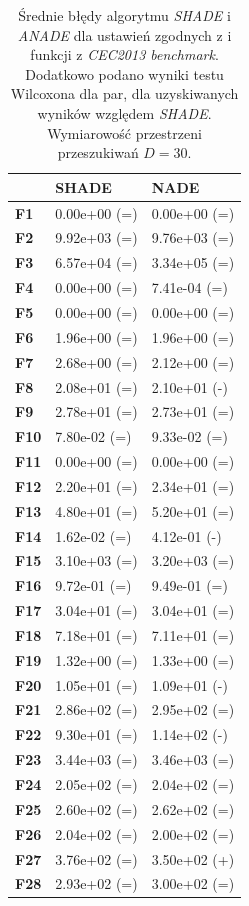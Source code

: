 \documentclass[12pt,a4paper]{report}
\begin{document}
{{{{{{\begin{table}[]
\centering
\caption{Średnie błędy algorytmu \emph{SHADE} i \emph{ANADE} dla ustawień zgodnych z \cite{SHADE} i funkcji z \emph{CEC2013 benchmark}. Dodatkowo podano wyniki testu Wilcoxona dla par, dla uzyskiwanych wyników względem \emph{SHADE}. Wymiarowość przestrzeni przeszukiwań $D = 30$.}
\label{Eksp230}
\begin{tabular}{|l|l|l|}
\hline
          & {\bf SHADE}  & {\bf NADE}   \\ \hline
{\bf F1}  & 0.00e+00 (=) & 0.00e+00 (=) \\ \hline
{\bf F2}  & 9.92e+03 (=) & 9.76e+03 (=) \\ \hline
{\bf F3}  & 6.57e+04 (=) & 3.34e+05 (=) \\ \hline
{\bf F4}  & 0.00e+00 (=) & 7.41e-04 (=) \\ \hline
{\bf F5}  & 0.00e+00 (=) & 0.00e+00 (=) \\ \hline
{\bf F6}  & 1.96e+00 (=) & 1.96e+00 (=) \\ \hline
{\bf F7}  & 2.68e+00 (=) & 2.12e+00 (=) \\ \hline
{\bf F8}  & 2.08e+01 (=) & 2.10e+01 (-) \\ \hline
{\bf F9}  & 2.78e+01 (=) & 2.73e+01 (=) \\ \hline
{\bf F10} & 7.80e-02 (=) & 9.33e-02 (=) \\ \hline
{\bf F11} & 0.00e+00 (=) & 0.00e+00 (=) \\ \hline
{\bf F12} & 2.20e+01 (=) & 2.34e+01 (=) \\ \hline
{\bf F13} & 4.80e+01 (=) & 5.20e+01 (=) \\ \hline
{\bf F14} & 1.62e-02 (=) & 4.12e-01 (-) \\ \hline
{\bf F15} & 3.10e+03 (=) & 3.20e+03 (=) \\ \hline
{\bf F16} & 9.72e-01 (=) & 9.49e-01 (=) \\ \hline
{\bf F17} & 3.04e+01 (=) & 3.04e+01 (=) \\ \hline
{\bf F18} & 7.18e+01 (=) & 7.11e+01 (=) \\ \hline
{\bf F19} & 1.32e+00 (=) & 1.33e+00 (=) \\ \hline
{\bf F20} & 1.05e+01 (=) & 1.09e+01 (-) \\ \hline
{\bf F21} & 2.86e+02 (=) & 2.95e+02 (=) \\ \hline
{\bf F22} & 9.30e+01 (=) & 1.14e+02 (-) \\ \hline
{\bf F23} & 3.44e+03 (=) & 3.46e+03 (=) \\ \hline
{\bf F24} & 2.05e+02 (=) & 2.04e+02 (=) \\ \hline
{\bf F25} & 2.60e+02 (=) & 2.62e+02 (=) \\ \hline
{\bf F26} & 2.04e+02 (=) & 2.00e+02 (=) \\ \hline
{\bf F27} & 3.76e+02 (=) & 3.50e+02 (+) \\ \hline
{\bf F28} & 2.93e+02 (=) & 3.00e+02 (=) \\ \hline
\end{tabular}
\end{table}

}}}}}}
\end{document}
